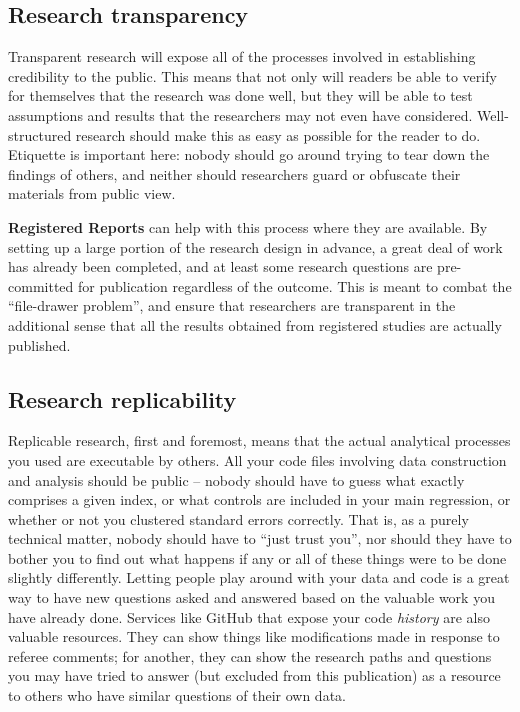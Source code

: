 \subsection{Research transparency}

Transparent research will expose all of the processes involved in establishing credibility to the public.
This means that not only will readers be able to verify for themselves that the research was done well,
but they will be able to test assumptions and results that the researchers may not even have considered.
Well-structured research should make this as easy as possible for the reader to do.
Etiquette is important here: nobody should go around trying to tear down the findings of others,
and neither should researchers guard or obfuscate their materials from public view.

\textbf{Registered Reports} can help with this process where they are available.
By setting up a large portion of the research design in advance,
a great deal of work has already been completed,
and at least some research questions are pre-committed for publication regardless of the outcome.
This is meant to combat the ``file-drawer problem'',\cite{simonsohn2014p}
and ensure that researchers are transparent in the additional sense that
all the results obtained from registered studies are actually published.

\subsection{Research replicability}

Replicable research, first and foremost, means that the actual analytical processes you used
are executable by others. All your code files involving data construction and analysis
should be public -- nobody should have to guess what exactly comprises a given index,
or what controls are included in your main regression,
or whether or not you clustered standard errors correctly.
That is, as a purely technical matter, nobody should have to ``just trust you'',
nor should they have to bother you to find out what happens
if any or all of these things were to be done slightly differently.\cite{simmons2011false,wicherts2016degrees}
Letting people play around with your data and code is a great way to have new questions asked and answered
based on the valuable work you have already done.
Services like GitHub that expose your code \textit{history}
are also valuable resources. They can show things like modifications
made in response to referee comments; for another, they can show
the research paths and questions you may have tried to answer
(but excluded from this publication)
as a resource to others who have similar questions of their own data.

